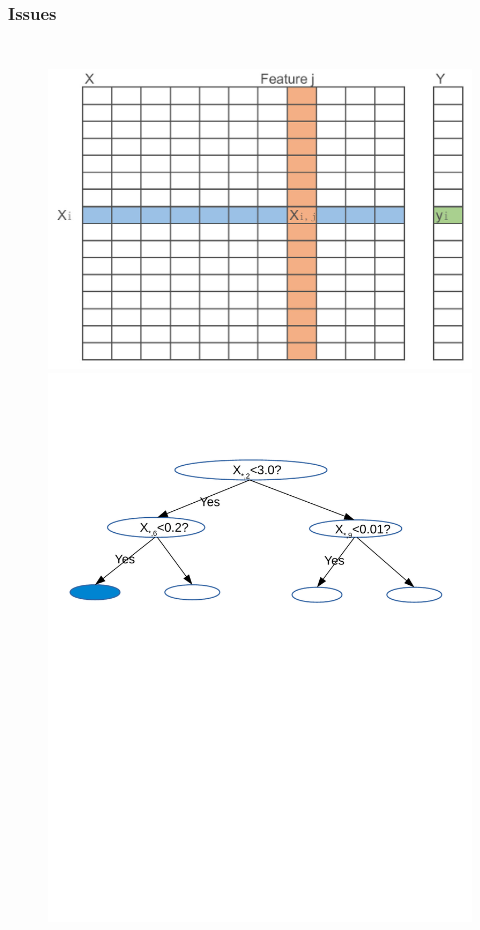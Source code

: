 \documentclass{beamer}
\begin{document}
\begin{frame}
	\frametitle{Issues}
	\begin{columns}[c] %
		\begin{figure}
			\includegraphics[width=1\linewidth]{figs/dataset.jpg} \\
			\includegraphics[width=1\linewidth]{figs/dtree}
		\end{figure}
		

\end{columns}
\end{frame}
\end{document}
